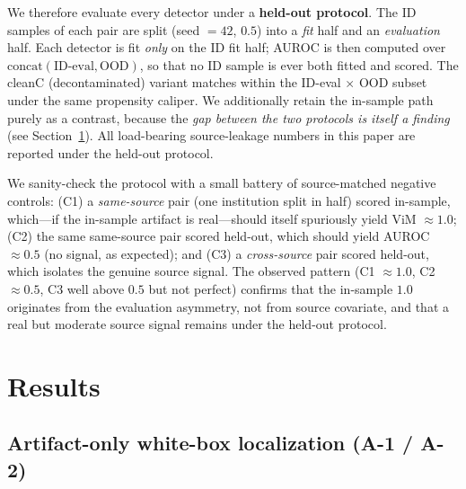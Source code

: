\documentclass{article}
\begin{document}
We therefore evaluate every detector under a \textbf{held-out protocol}. The ID
samples of each pair are split (seed $=42$, $0.5$) into a \emph{fit} half and an
\emph{evaluation} half. Each detector is fit \emph{only} on the ID fit half;
AUROC is then computed over $\mathrm{concat}(\text{ID-eval}, \text{OOD})$, so
that no ID sample is ever both fitted and scored. The cleanC (decontaminated)
variant matches within the ID-eval $\times$ OOD subset under the same propensity
caliper. We additionally retain the in-sample path purely as a contrast, because
the \emph{gap between the two protocols is itself a finding} (see
Section~\ref{sec:results}). All load-bearing source-leakage numbers in this paper
are reported under the held-out protocol.

We sanity-check the protocol with a small battery of source-matched negative
controls: (C1) a \emph{same-source} pair (one institution split in half) scored
in-sample, which---if the in-sample artifact is real---should itself spuriously
yield ViM $\approx 1.0$; (C2) the same same-source pair scored held-out, which
should yield AUROC $\approx 0.5$ (no signal, as expected); and (C3) a
\emph{cross-source} pair scored held-out, which isolates the genuine source
signal. The observed pattern (C1 $\approx 1.0$, C2 $\approx 0.5$, C3 well above
$0.5$ but not perfect) confirms that the in-sample $1.0$ originates from the
evaluation asymmetry, not from source covariate, and that a real but moderate
source signal remains under the held-out protocol.

\section{Results}
\label{sec:results}

\subsection{Artifact-only white-box localization (A-1 / A-2)}
\end{document}
